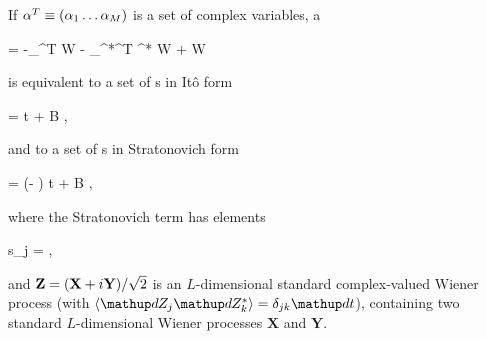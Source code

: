 \begin{theorem}
\label{thm:fpe-sde:corr:fpe-sde-complex}
	If $\mathbf{\alpha}^T \equiv (\alpha_1 \ldots \alpha_M)$ is a set of complex variables, a 
	\begin{eqn*}
		= -\vcwd_{\balpha}^T \avec W - \vcwd_{\balpha^*}^T \avec^* W
		+  W
	\end{eqn*}
	is equivalent to a set of s in It\^{o} form
	\begin{eqn*}
		\upd\balpha = \avec \upd t + B \upd\Zvec,
	\end{eqn*}
	and to a set of s in Stratonovich form
	\begin{eqn*}
		\upd\balpha = (\avec - \svec) \upd t + B \upd\Zvec,
	\end{eqn*}
	where the Stratonovich term has elements
	\begin{eqn*}
		s_j =  \Trace{ B^H \vcwd_{\balpha^*} \evec_j^T B },
	\end{eqn*}
	and $\mathbf{Z} = (\mathbf{X} + i\mathbf{Y}) / \sqrt{2}$ is an $L$-dimensional standard complex-valued Wiener process (with $\langle \upd Z_j \upd Z_k^* \rangle = \delta_{jk} \upd t$), containing two standard $L$-dimensional Wiener processes $\mathbf{X}$ and $\mathbf{Y}$.
\end{theorem}

